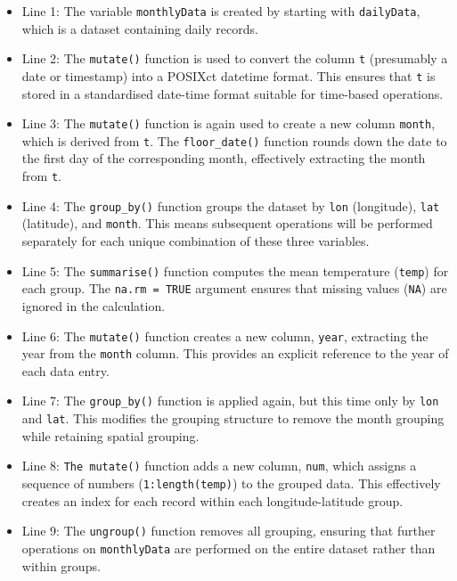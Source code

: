 \documentclass[
  10t,
]{article}
\providecommand{\tightlist}{%
  \setlength{\itemsep}{0pt}\setlength{\parskip}{0pt}}
\let\oldtexttt\texttt
\renewcommand{\texttt}[1]{\oldtexttt{\small #1}}
\begin{document}
\begin{itemize}
\tightlist
\item
  Line 1: The variable \texttt{monthlyData} is created by starting with
  \texttt{dailyData}, which is a dataset containing daily records.
\item
  Line 2: The \texttt{mutate()} function is used to convert the column
  \texttt{t} (presumably a date or timestamp) into a POSIXct datetime
  format. This ensures that \texttt{t} is stored in a standardised
  date-time format suitable for time-based operations.
\item
  Line 3: The \texttt{mutate()} function is again used to create a new
  column \texttt{month}, which is derived from \texttt{t}. The
  \texttt{floor\_date()} function rounds down the date to the first day
  of the corresponding month, effectively extracting the month from
  \texttt{t}.
\item
  Line 4: The \texttt{group\_by()} function groups the dataset by
  \texttt{lon} (longitude), \texttt{lat} (latitude), and \texttt{month}.
  This means subsequent operations will be performed separately for each
  unique combination of these three variables.
\item
  Line 5: The \texttt{summarise()} function computes the mean
  temperature (\texttt{temp}) for each group. The
  \texttt{na.rm\ =\ TRUE} argument ensures that missing values
  (\texttt{NA}) are ignored in the calculation.
\item
  Line 6: The \texttt{mutate()} function creates a new column,
  \texttt{year}, extracting the year from the \texttt{month} column.
  This provides an explicit reference to the year of each data entry.
\item
  Line 7: The \texttt{group\_by()} function is applied again, but this
  time only by \texttt{lon} and \texttt{lat}. This modifies the grouping
  structure to remove the month grouping while retaining spatial
  grouping.
\item
  Line 8: \texttt{The\ mutate()} function adds a new column,
  \texttt{num}, which assigns a sequence of numbers
  (\texttt{1:length(temp)}) to the grouped data. This effectively
  creates an index for each record within each longitude-latitude group.
\item
  Line 9: The \texttt{ungroup()} function removes all grouping, ensuring
  that further operations on \texttt{monthlyData} are performed on the
  entire dataset rather than within groups.
\end{itemize}
\end{document}
